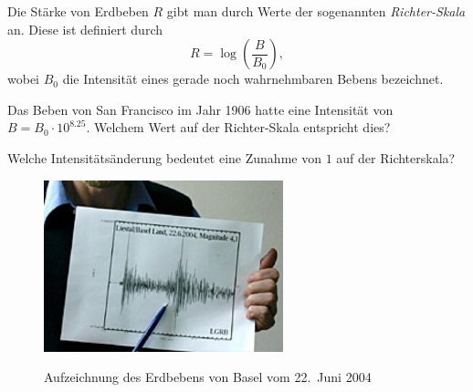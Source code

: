 \documentclass[%
11pt,%
twoside,%
titlepage,%
german,%
headsepline%
]{scrartcl}
\begin{document}
\begin{ueb}[Richterskala]\label{erdbeben}
Die Stärke von Erdbeben $R$ gibt man durch Werte der sogenannten
    \emph{Richter-Skala} an. Diese ist definiert durch
    $$R=\log\left(\frac{B}{B_0}\right),$$ wobei $B_0$ die Intensität
    eines gerade noch wahrnehmbaren Bebens bezeichnet.

  \begin{enumeratea}
    \item Das Beben von San Francisco im Jahr 1906 hatte eine
    Intensität von $B=B_0\cdot10^{8.25}$. Welchem Wert auf der
    Richter-Skala entspricht dies?
    \item Welche Intensitätsänderung bedeutet eine Zunahme von $1$
    auf der Richterskala?
  \end{enumeratea}  
    \begin{figure}
  \centering
    \includegraphics[width=0.618\textwidth]{pictures/erdbebenbasel}\\
    \caption{Aufzeichnung des Erdbebens von Basel vom 22.~Juni 2004}
  \end{figure}
  
\end{ueb}
\end{document}
